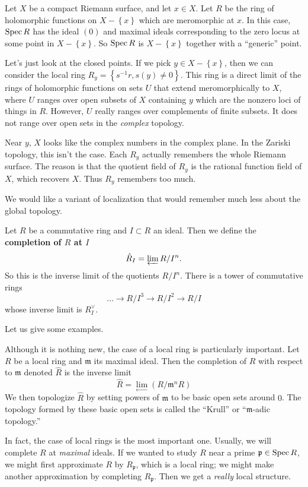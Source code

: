 \begin{example} 
Let $X$ be a compact Riemann surface, and let $x \in X$. Let $R$ be the ring of
holomorphic functions on $X - \left\{x\right\}$ which are meromorphic at $x$.
In this case, $\operatorname{Spec} R$ has the ideal $(0)$ and maximal ideals corresponding to
the zero locus at some point in $X - \left\{x\right\}$. So $\operatorname{Spec} R$ is $X -
\left\{x\right\}$ together with a ``generic'' point.

Let's just look at the closed points.  If we pick $y \in X - \left\{x\right\}$,
then we can consider the local ring $R_y = \left\{s^{-1}r, s(y) \neq
0\right\}$. This ring is a direct limit of the rings of holomorphic functions
on sets $U$ that extend meromorphically to $X$, where $U$ ranges over open
subsets of $X$ containing $y$ which are the nonzero loci of things in $R$. However, $U$ really ranges over complements of
finite subsets. It does not range over open sets in the \emph{complex} topology.

Near $y$, $X$ looks like the complex numbers in the complex plane. In the Zariski topology, this
isn't the case. Each $R_y$ actually remembers the whole Riemann surface. The
reason is that the quotient field of $R_y$ is the rational function field of
$X$, which recovers $X$. Thus $R_y$ remembers too much. 
\end{example} 

We would like a variant of localization that would remember much less about the
global topology.


\begin{definition} 
Let $R$ be a commutative ring and $I \subset R$ an ideal. Then we define the
\textbf{completion of $R$ at $I$}
\[ \hat{R}_I = \varprojlim R/I^n.  \]
So this is the inverse limit of the quotients $R/I^n$. There is a tower of
commutative rings
\[ \dots \to  R/I^3 \to R/I^2 \to R/I   \]
whose inverse limit is $R^{\vee}_I$. 
\end{definition} 



Let us give some examples.
\begin{example} 
Although it is nothing new, the case of a local ring is particularly
important. Let $R$ be a local ring and $\mathfrak{m}$ its maximal ideal. Then the completion of $R$ with respect to $\mathfrak{m}$ denoted $\hat{R}$ is the inverse limit 
\begin{equation}
\hat{R}=\lim_{\leftarrow}(R/\mathfrak{m}^nR)\end{equation} We then topologize $\hat{R}$ by setting powers of $\mathfrak{m}$ to be basic open sets around $0$. The topology formed by these basic open sets is called the ``Krull'' or ``$\mathfrak{m}$-adic topology.''

In fact, the case of local rings is the most important one.
Usually, we will complete $R$ at \emph{maximal} ideals.
If we wanted to study $R$ near a prime $\mathfrak{p} \in \operatorname{Spec} R$, we might
first approximate $R$ by $R_{\mathfrak{p}}$, which is a local ring; we might
make another approximation by completing $R_{\mathfrak{p}}$. Then we get a
\emph{really} local structure. 
\end{example}

